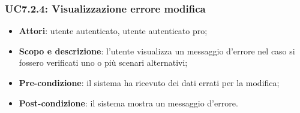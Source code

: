 	\subsubsection{UC7.2.4: Visualizzazione errore modifica}
	\begin{itemize}
		\item
			\textbf{Attori}: utente autenticato, utente autenticato pro;
		\item
			\textbf{Scopo e descrizione}: l'utente visualizza un messaggio d'errore nel caso si fossero verificati uno o più scenari alternativi;
		\item		
			\textbf{Pre-condizione}: il sistema ha ricevuto dei dati errati per la modifica;
		\item
			\textbf{Post-condizione}: il sistema mostra un messaggio d'errore.
	\end{itemize}	
	
